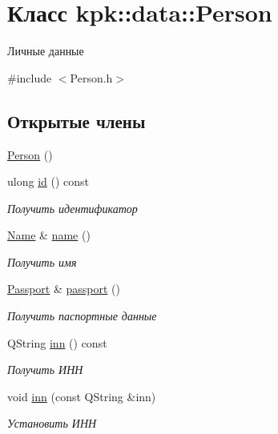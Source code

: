 \hypertarget{classkpk_1_1data_1_1_person}{}\section{Класс kpk\+:\+:data\+:\+:Person}
\label{classkpk_1_1data_1_1_person}


Личные данные  




{\ttfamily \#include $<$Person.\+h$>$}

\subsection*{Открытые члены}
\begin{DoxyCompactItemize}
\item 
\hyperlink{classkpk_1_1data_1_1_person_a3d3734c98d4d71765b46ba63faf40d42}{Person} ()
\item 
ulong \hyperlink{classkpk_1_1data_1_1_person_ae8b70e7cdc9ebd68052a177a08110002}{id} () const 
\begin{DoxyCompactList}\small\item\em Получить идентификатор \end{DoxyCompactList}\item 
\hyperlink{classkpk_1_1data_1_1_name}{Name} \& \hyperlink{classkpk_1_1data_1_1_person_ad67f8ee4a541984f988e909eb0f18370}{name} ()
\begin{DoxyCompactList}\small\item\em Получить имя \end{DoxyCompactList}\item 
\hyperlink{classkpk_1_1data_1_1_passport}{Passport} \& \hyperlink{classkpk_1_1data_1_1_person_a38b692a8236cba1673554b3c6ed972b3}{passport} ()
\begin{DoxyCompactList}\small\item\em Получить паспортные данные \end{DoxyCompactList}\item 
Q\+String \hyperlink{classkpk_1_1data_1_1_person_a718b0634bef8c0281a8553afafd3ffd8}{inn} () const 
\begin{DoxyCompactList}\small\item\em Получить ИНН \end{DoxyCompactList}\item 
void \hyperlink{classkpk_1_1data_1_1_person_a8a3633d768cdb21913f499d0e89b72de}{inn} (const Q\+String \&inn)
\begin{DoxyCompactList}\small\item\em Установить ИНН \end{DoxyCompactList}\item 

\end{DoxyCompactItemize}
